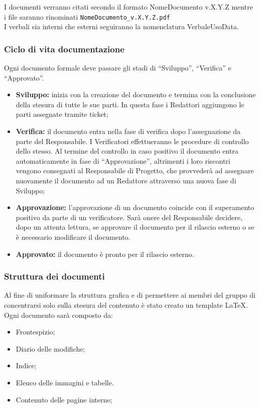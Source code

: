 I documenti verranno citati secondo il formato NomeDocumento v.X.Y.Z mentre i file saranno rinominati \texttt{NomeDocumento\_v.X.Y.Z.pdf} \\
I verbali sia interni che esterni seguiranno la nomenclatura VerbaleUsoData.

\subsubsection{Ciclo di vita documentazione}
Ogni documento formale deve passare gli stadi di ``Sviluppo”, ``Verifica” e ``Approvato”.
\begin{itemize}
	\item \textbf{Sviluppo:} inizia con la creazione del documento e termina con la conclusione	della stesura di tutte le sue parti. In questa fase i Redattori aggiungono le parti assegnate tramite ticket;
	
	\item  \textbf{Verifica:} il documento entra nella fase di verifica dopo l’assegnazione da
	parte del Responsabile. I Verificatori effettueranno le procedure di controllo
	dello stesso.
	Al termine del controllo in caso positivo il documento entra automaticamente
	in fase di ``Approvazione”, altrimenti i loro riscontri vengono consegnati
	al Responsabile di Progetto, che provvederà ad assegnare nuovamente il
	documento ad un Redattore attraverso una nuova fase di Sviluppo;
	
	\item  \textbf{Approvazione:} l’approvazione di un documento coincide con il superamento
	positivo da parte di un verificatore. 
	Sarà onere del Responsabile decidere, dopo un attenta lettura, se approvare il documento per il rilascio esterno o se è necessario modificare il documento.

	
	\item  \textbf{Approvato:} il documento è pronto per il rilascio esterno.
\end{itemize}


\subsubsection{Struttura dei documenti}
Al fine di uniformare la struttura grafica e di permettere ai membri del gruppo di concentrarsi solo sulla stesura del contenuto è stato creato un template \LaTeX.
Ogni documento sarà composto da:
\begin{itemize}
	\item Frontespizio;
	\item Diario delle modifiche;
	\item Indice;
	\item Elenco delle immagini e tabelle.
	\item Contenuto delle pagine interne;
\end{itemize}
